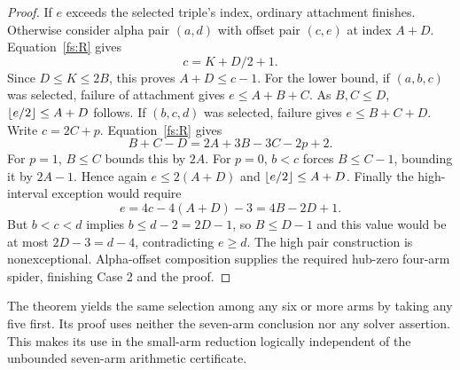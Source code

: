 \begin{proof}
If $e$ exceeds the selected triple's index, ordinary attachment finishes. Otherwise consider alpha pair $(a,d)$ with offset pair $(c,e)$ at index $A+D$. Equation~\eqref{fs:R} gives
\[
c=K+D/2+1.
\]
Since $D\le K\le2B$, this proves $A+D\le c-1$. For the lower bound, if $(a,b,c)$ was selected, failure of attachment gives $e\le A+B+C$. As $B,C\le D$, $\left\lfloor e/2\right\rfloor\le A+D$ follows. If $(b,c,d)$ was selected, failure gives $e\le B+C+D$. Write $c=2C+p$. Equation~\eqref{fs:R} gives
\[
B+C-D=2A+3B-3C-2p+2.
\]
For $p=1$, $B\le C$ bounds this by $2A$. For $p=0$, $b<c$ forces $B\le C-1$, bounding it by $2A-1$. Hence again $e\le2(A+D)$ and $\left\lfloor e/2\right\rfloor\le A+D$.
Finally the high-interval exception would require
\[
e=4c-4(A+D)-3=4B-2D+1.
\]
But $b<c<d$ implies $b\le d-2=2D-1$, so $B\le D-1$ and this value would be at most $2D-3=d-4$, contradicting $e\ge d$. The high pair construction is nonexceptional. Alpha-offset composition supplies the required hub-zero four-arm spider, finishing Case 2 and the proof.
\end{proof}

The theorem yields the same selection among any six or more arms by taking any five first. Its proof uses neither the seven-arm conclusion nor any solver assertion. This makes its use in the small-arm reduction logically independent of the unbounded seven-arm arithmetic certificate.
